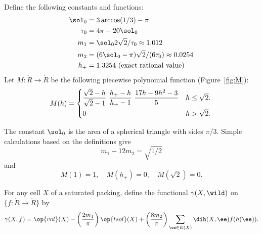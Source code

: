 \begin{definition} 
%
%
%
%
%
%
Define the following constants and functions: 
\begin{align}\label{eqn:m-def} 
\sol_0 &= 3\arccos(1/3)-\pi\\
\tau_0 &= 4\pi  - 20\sol_0\\
m_1 &= \sol_0 2\sqrt2/\tau_0 \approx 1.012 \\ %
m_2  &=  (6\sol_0- \pi)\sqrt2/(6 \tau_0) \approx 0.0254\\ %
h_+ &= 1.3254 \hbox{~(exact rational value)}
\end{align}
Let $M:\ring{R}\to\ring{R}$ 
be the following piecewise polynomial function (Figure~\ref{fig:M}):
\begin{equation}\label{eqn:M} 
M(h) =
\begin{cases} 
\dfrac{\sqrt2-h}{\sqrt2-1}~ \dfrac{h_+-h}{h_+-1} ~\dfrac{17 h - 9 h^2 - 3}{5} 
& h \le \sqrt2.\vspace{3pt} \\
0 & h >\sqrt2.
\end{cases}
\\
\end{equation}
\end{definition}

\tuligly

The constant $\sol_0$
is the area of a spherical triangle with sides $\pi/3$.
Simple calculations based on the definitions give
\begin{equation}\label{eqn:km}m_1 - 12m_2 = \sqrt{1/2}\end{equation} 
and
\begin{equation}M(1) = 1,\quad M(h_+)=0,\quad M(\sqrt2) =0.\end{equation} 

\begin{definition}[$\gamma$] 
For any cell $X$ of a saturated packing, 
define the functional $\gamma(X,\wild)$ on  $\{f:\ring{R}\to\ring{R}\}$ by
\begin{equation}\label{eqn:gamma-def} 
\gamma(X,f) =  \op{vol}(X)
-\left(\frac{2m_1}{\pi}\right) \op{tsol}(X) + \left(\frac{8m_2}{\pi}\right)
\sum_{\ee\in E(X)} \dih(X,\ee)  f(h(\ee)).
\end{equation}
%
\end{definition}


